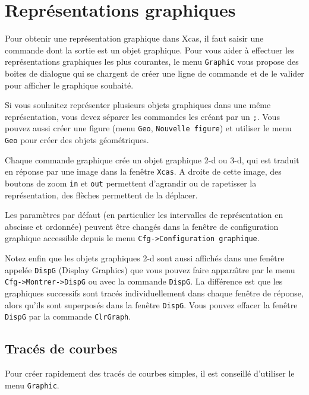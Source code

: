 \documentclass{article}
\begin{document}
\section{Repr\'esentations graphiques}
%
Pour obtenir une repr\'esentation graphique dans Xcas, il faut saisir une commande
dont la sortie est un objet graphique.
Pour vous aider \`a effectuer les repr\'esentations graphiques les plus courantes,
le menu \verb|Graphic| vous propose des boites de dialogue qui se chargent
de cr\'eer une ligne de commande et de le valider pour afficher le graphique souhait\'e.

Si vous souhaitez repr\'esenter plusieurs objets graphiques dans une m\^eme repr\'esentation,
vous devez s\'eparer les commandes les cr\'eant par un \verb|;|. Vous pouvez aussi cr\'eer
une figure (menu \verb|Geo|, \verb|Nouvelle figure|) et utiliser le menu \verb|Geo|
pour cr\'eer des objets g\'eom\'etriques.

Chaque commande graphique cr\'ee un objet graphique 2-d ou 3-d, qui est traduit
en r\'eponse par une image dans la fen\^etre {\tt Xcas}. A droite de cette
image, des boutons de zoom \verb|in| et \verb|out| permettent
d'agrandir ou de rapetisser la repr\'esentation, des fl\`eches
permettent de la d\'eplacer. 

Les param\`etres par d\'efaut (en
particulier les intervalles de repr\'esentation en abscisse et
ordonn\'ee) peuvent \^etre chang\'es dans la fen\^etre de configuration
graphique accessible depuis le menu
\verb|Cfg->Configuration graphique|.

Notez enfin que les objets graphiques 2-d sont 
aussi affich\'es dans une fen\^etre appel\'ee
\verb|DispG| (Display Graphics) que vous pouvez faire appara\^\i tre par le 
menu
\verb|Cfg->Montrer->DispG| ou avec la commande 
\verb|DispG|. La diff\'erence est que les graphiques successifs sont trac\'es
individuellement dans chaque fen\^etre de r\'eponse, alors qu'ils sont
superpos\'es dans la fen\^etre \verb|DispG|. Vous pouvez effacer la
fen\^etre \verb|DispG| par la commande \verb|ClrGraph|.

\subsection{Trac\'es de courbes}
%
Pour cr\'eer rapidement des trac\'es de courbes simples, 
il est conseill\'e d'utiliser le menu \verb|Graphic|.
\end{document}
